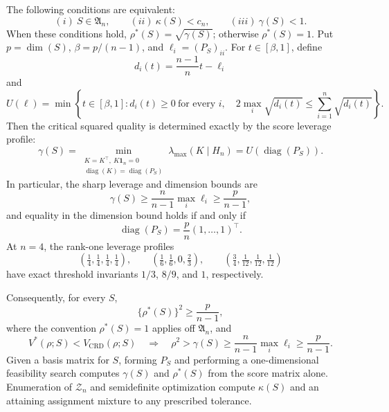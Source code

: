 The following conditions are equivalent:
\[
(i)\ S\in\mathfrak A_n,
\qquad
(ii)\ \kappa(S)<c_n,
\qquad
(iii)\ \gamma(S)<1.
\]
When these conditions hold, \(\rho^*(S)=\sqrt{\gamma(S)}\); otherwise \(\rho^*(S)=1\).  Put \(p=\dim(S)\), \(\beta=p/(n-1)\), and \(\ell_i=(P_S)_{ii}\).  For \(t\in[\beta,1]\), define
\[
d_i(t)=\frac{n-1}{n}t-\ell_i
\]
and
\[
U(\ell)=\min\left\{
t\in[\beta,1]:
d_i(t)\geq0\ \text{for every }i,\quad
2\max_i\sqrt{d_i(t)}\leq\sum_{i=1}^n\sqrt{d_i(t)}
\right\}.
\]
Then the critical squared quality is determined exactly by the score leverage profile:
\[
\gamma(S)
=\min_{\substack{K=K^\top,\ K\mathbf1_n=0\\
\operatorname{diag}(K)=\operatorname{diag}(P_S)}}
\lambda_{\max}(K\mid H_n)
=U\!\left(\operatorname{diag}(P_S)\right).
\]
In particular, the sharp leverage and dimension bounds are
\[
\gamma(S)\geq\frac{n}{n-1}\max_i\ell_i
\geq\frac{p}{n-1},
\]
and equality in the dimension bound holds if and only if
\[
\operatorname{diag}(P_S)=\frac{p}{n}(1,\ldots,1)^\top.
\]
At \(n=4\), the rank-one leverage profiles
\[
\left(\tfrac14,\tfrac14,\tfrac14,\tfrac14\right),\qquad
\left(\tfrac16,\tfrac16,0,\tfrac23\right),\qquad
\left(\tfrac34,\tfrac1{12},\tfrac1{12},\tfrac1{12}\right)
\]
have exact threshold invariants \(1/3\), \(8/9\), and \(1\), respectively.

Consequently, for every \(S\),
\[
\{\rho^*(S)\}^2\geq\frac{p}{n-1},
\]
where the convention \(\rho^*(S)=1\) applies off \(\mathfrak A_n\), and
\[
V^*(\rho;S)<V_{\mathrm{CRD}}(\rho;S)
\quad\Longrightarrow\quad
\rho^2>\gamma(S)\geq\frac{n}{n-1}\max_i\ell_i
\geq\frac{p}{n-1}.
\]
Given a basis matrix for \(S\), forming \(P_S\) and performing a one-dimensional feasibility search computes \(\gamma(S)\) and \(\rho^*(S)\) from the score matrix alone.  Enumeration of \(\mathcal Z_n\) and semidefinite optimization compute \(\kappa(S)\) and an attaining assignment mixture to any prescribed tolerance.